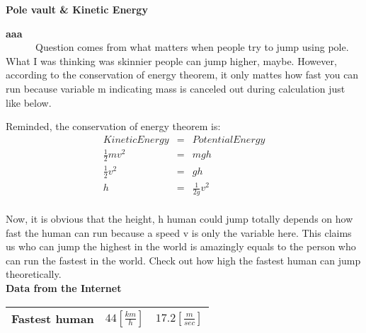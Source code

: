 \documentclass[12pt,letterpaper,fleqn]{article}
\begin{document}
\hfill
\begin{center}
{\LARGE\bf Pole vault \& Kinetic Energy}
\end{center}
{\large\bf aaa}\\
\ \ \ \ \ \ Question comes from what matters when people try to jump using pole.
What I was thinking was skinnier people can jump higher, maybe.
However, according to the conservation of energy theorem, it only mattes how fast you can run because variable m indicating mass is canceled out during calculation just like below.

Reminded, the conservation of energy theorem is:
\begin{eqnarray}
Kinetic Energy &=& Potential Energy\\
\frac{1}{2} mv^2 &=& mgh\\
\frac{1}{2} v^2 &=& gh\\
h &=& \frac{1}{2g} v^2 \\ 
\end{eqnarray}

Now, it is obvious that the height, h human could jump totally depends on how fast the human can run because a speed v is only the variable here.
This claims us who can jump the highest in the world is amazingly equals to the person who can run the fastest in the world.
Check out how high the fastest human can jump theoretically.\\
{\large \bf Data from the Internet}

\begin{table}[htb]
\begin{center}
\begin{tabular}{|r||c|c||}\hline
Fastest human & $44[\frac{km}{h}]$ & $17.2 [\frac{m}{sec}]$\\\hline

\end{tabular}
\end{center}
\end{table}


 
\end{document}
